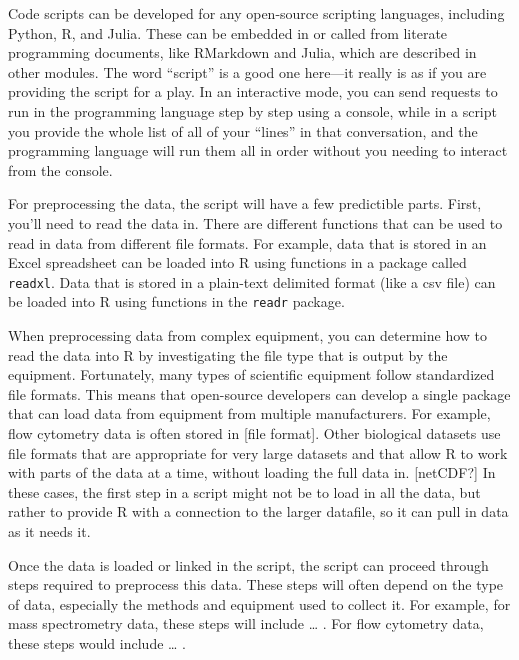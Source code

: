 \documentclass[]{tufte-book}
\begin{document}
Code scripts can be developed for any open-source scripting languages, including
Python, R, and Julia. These can be embedded in or called from literate programming
documents, like RMarkdown and Julia, which are described in other modules. The
word ``script'' is a good one here---it really is as if you are providing the script
for a play. In an interactive mode, you can send requests to run in the programming
language step by step using a console, while in a script you provide the whole list
of all of your ``lines'' in that conversation, and the programming language will run
them all in order without you needing to interact from the console.

For preprocessing the data, the script will have a few predictible parts. First,
you'll need to read the data in. There are different functions that can be used
to read in data from different file formats. For example, data that is stored in
an Excel spreadsheet can be loaded into R using functions in a package called
\texttt{readxl}. Data that is stored in a plain-text delimited format (like a csv file)
can be loaded into R using functions in the \texttt{readr} package.

When preprocessing data from complex equipment, you can determine how to read the
data into R by investigating the file type that is output by the equipment.
Fortunately, many types of scientific equipment follow standardized file formats.
This means that open-source developers can develop a single package that can
load data from equipment from multiple manufacturers. For example, flow cytometry
data is often stored in {[}file format{]}. Other biological datasets use file
formats that are appropriate for very large datasets and that allow R to work
with parts of the data at a time, without loading the full data in. {[}netCDF?{]}
In these cases, the first step in a script might not be to load in all the data,
but rather to provide R with a connection to the larger datafile, so it can
pull in data as it needs it.

Once the data is loaded or linked in the script, the script can proceed through
steps required to preprocess this data. These steps will often depend on the type
of data, especially the methods and equipment used to collect it. For example, for
mass spectrometry data, these steps will include \ldots{} . For flow cytometry data,
these steps would include \ldots{} .
\end{document}
